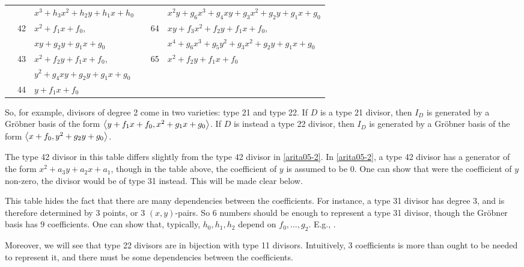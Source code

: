 \begin{center}
\begin{tabular}{l|l|l||l|l|l}
    & & $x^3 + h_3x^2 + h_2y + h_1x + h_0$ & & & $x^2y + g_6x^3 + g_4xy + g_3x^2 + g_2y + g_1x + g_0$ \\
    \cline{2-3}\cline{5-6}
    &\multirow{2}{*}{42} & $x^2 + f_1x + f_0$, & &\multirow{2}{*}{64} & $xy + f_3x^2 + f_2y + f_1x + f_0$, \\
    & & $xy + g_2y + g_1x + g_0$ & & & $x^4 + g_6x^3 + g_5y^2 + g_3x^2 + g_2y + g_1x + g_0$ \\
    \cline{2-3}\cline{5-6}
    &\multirow{2}{*}{43} & $x^2 + f_2y + f_1x + f_0$, & &\multirow{1}{*}{65} & $x^2 + f_2y + f_1x + f_0$ \\
    \cline{4-6}
    & & $y^2 + g_4xy + g_2y + g_1x + g_0$ \\
    \cline{2-3}
    &\multirow{1}{*}{44}
      & $y + f_1x + f_0$
\end{tabular}
\end{center}

So, for example, divisors of degree 2 come in two varieties: type 21 and type 22.
If $D$ is a type 21 divisor,
then $I_D$ is generated by a Gr\"obner basis of the form $\left\langle y + f_1x + f_0, x^2 + g_1x + g_0 \right\rangle$.
If $D$ is instead a type 22 divisor,
then $I_D$ is generated by a Gr\"obner basis of the form $\left\langle x + f_0, y^2 + g_2y + g_0 \right\rangle$.

The type 42 divisor in this table differs slightly from the type 42 divisor in \ref{arita05-2}.
In \ref{arita05-2}, a type 42 divisor has a generator of the form $x^2 + a_3y + a_2x + a_1$,
though in the table above, the coefficient of $y$ is assumed to be 0.
One can show that were the coefficient of $y$ non-zero, the divisor would be of type 31 instead.
This will be made clear below.

This table hides the fact that there are many dependencies between the coefficients.
For instance, a type 31 divisor has degree 3, and is therefore determined by 3 points, or 3 $(x,y)$-pairs.
So 6 numbers should be enough to represent a type 31 divisor, though the Gr\"obner basis has 9 coefficients.
One can show that, typically, $h_0, h_1, h_2$ depend on $f_0, \ldots, g_2$. E.g., .

Moreover, we will see that type 22 divisors are in bijection with type 11 divisors.
Intuitively, 3 coefficients is more than ought to be needed to represent it,
and there must be some dependencies between the coefficients.




